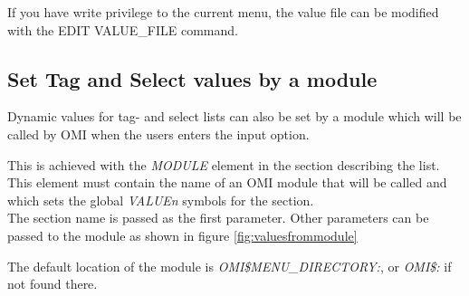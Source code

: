 \documentclass[a4paper]{book}
\begin{document}
If you have write privilege to the current menu, the value file can be 
modified with the \textsf{EDIT VALUE{\_}FILE} command.

\subsection{Set Tag and Select values by a module}
\label{subsubsec:dynamicvalues}

Dynamic values for tag- and select lists can also be set by a module which will be called by 
OMI when the users enters the input option.

This is achieved with the \textsl{MODULE} element in the section describing the list. This element
must contain the name of an OMI module that will be called and which sets the global \textsl{VALUE\textit{n}} symbols for the section. \\
The section name is passed as the first parameter. Other parameters can be passed to the module
as shown in figure \ref{fig:valuesfrommodule}

The default location of the module is \textsl{OMI{\$}MENU{\_}DIRECTORY:}, or \textsl{OMI{\$}:} if 
not found there.
\end{document}
